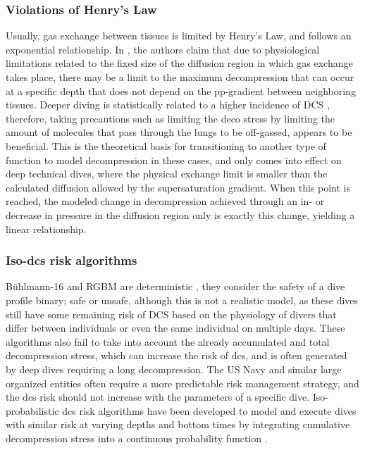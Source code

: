 \subsubsection{Violations of Henry's Law} 
Usually, gas exchange between tissues is limited by Henry's Law, and follows an exponential relationship.
In \cite{diff-lim-deco-2003}, the authors claim that due to physiological limitations related to the fixed size of the diffusion region in which gas exchange takes place, there may be a limit to the maximum decompression that can occur at a specific depth that does not depend on the \gls{pp}-gradient between neighboring tissues. 
Deeper diving is statistically related to a higher incidence of DCS \cite{dan-understanding-dcs-2022}, therefore, taking precautions such as limiting the \gls{deco} stress by limiting the amount of molecules that pass through the lungs to be off-gassed, appears to be beneficial.
This is the theoretical basis for transitioning to another type of function to model decompression in these cases, and only comes into effect on deep technical dives, where the physical exchange limit is smaller than the calculated diffusion allowed by the supersaturation gradient. 
When this point is reached, the modeled change in decompression achieved through an in- or decrease in pressure in the diffusion region only is exactly this change, yielding a linear relationship.

\subsubsection{Iso-\gls{dcs} risk algorithms} 
Bühlmann-16 and RGBM are deterministic \cite{dev-iso-risk-1996}, they consider the safety of a dive profile binary; safe or unsafe, although this is not a realistic model, as these dives still have some remaining risk of DCS based on the physiology of divers that differ between individuals or even the same individual on multiple days. 
These algorithms also fail to take into account the already accumulated and total decompression stress, which can increase the risk of \gls{dcs}, and is often generated by deep dives requiring a long decompression.
The US Navy and similar large organized entities often require a more predictable risk management strategy, and the \gls{dcs} risk should not increase with the parameters of a specific dive.
Iso-probabilistic \gls{dcs} risk algorithms have been developed to model and execute dives with similar risk at varying depths and bottom times by integrating cumulative decompression stress into a continuous probability function \cite{likelihood-dcs-1984}.

